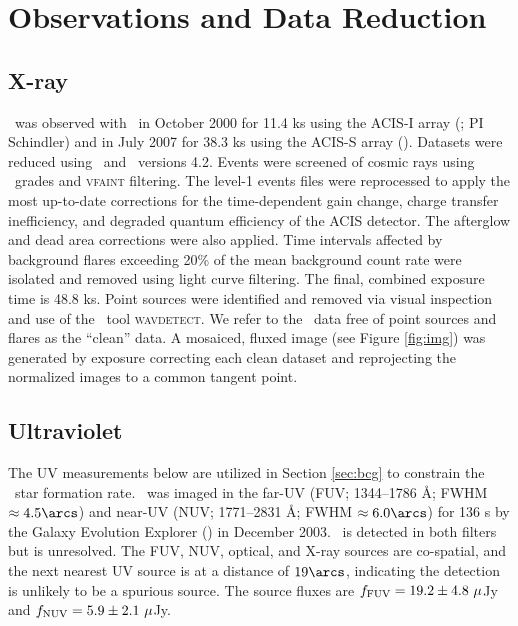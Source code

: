 \documentclass[iop]{emulateapj}
\begin{document}
\section{Observations and Data Reduction}
\label{sec:obs}

\subsection{X-ray}

\rbs\ was observed with \cxo\ in October 2000 for 11.4 ks using the
ACIS-I array (; PI
Schindler) and in July 2007 for 38.3 ks using the ACIS-S array
(). Datasets were reduced
using \ciao\ and \caldb\ versions 4.2. Events were screened of cosmic
rays using \asca\ grades and {\textsc{vfaint}} filtering. The level-1
events files were reprocessed to apply the most up-to-date corrections
for the time-dependent gain change, charge transfer inefficiency, and
degraded quantum efficiency of the ACIS detector. The afterglow and
dead area corrections were also applied. Time intervals affected by
background flares exceeding 20\% of the mean background count rate
were isolated and removed using light curve filtering. The final,
combined exposure time is 48.8 ks. Point sources were identified and
removed via visual inspection and use of the \ciao\ tool
{\textsc{wavdetect}}. We refer to the \cxo\ data free of point sources
and flares as the ``clean'' data. A mosaiced, fluxed image (see Figure
\ref{fig:img}) was generated by exposure correcting each clean dataset
and reprojecting the normalized images to a common tangent point.

\subsection{Ultraviolet}

The UV measurements below are utilized in Section \ref{sec:bcg} to
constrain the \rbs\ star formation rate. \rbs\ was imaged in the
far-UV (FUV; 1344--1786 \AA; FWHM $\approx 4.5\arcs$) and near-UV
(NUV; 1771--2831 \AA; FWHM $\approx 6.0\arcs$) for 136 s by the Galaxy
Evolution Explorer (\galex) in December 2003. \rbs\ is detected in
both filters but is unresolved. The FUV, NUV, optical, and X-ray
sources are co-spatial, and the next nearest UV source is at a
distance of $19\arcs$, indicating the detection is unlikely to be a
spurious source. The source fluxes are $f_{\rm{FUV}} = 19.2 \pm 4.8
~\mu$Jy and $f_{\rm{NUV}} = 5.9 \pm 2.1 ~\mu$Jy.
\end{document}
